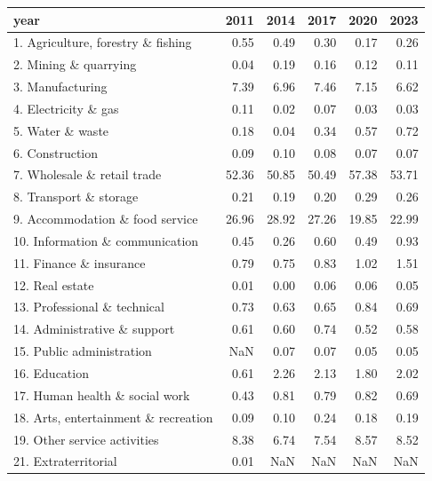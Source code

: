 \begin{tabular}{lrrrrr}
\toprule
year & 2011 & 2014 & 2017 & 2020 & 2023 \\
\midrule
1. Agriculture, forestry \& fishing & 0.55 & 0.49 & 0.30 & 0.17 & 0.26 \\
2. Mining \& quarrying & 0.04 & 0.19 & 0.16 & 0.12 & 0.11 \\
3. Manufacturing & 7.39 & 6.96 & 7.46 & 7.15 & 6.62 \\
4. Electricity \& gas & 0.11 & 0.02 & 0.07 & 0.03 & 0.03 \\
5. Water \& waste & 0.18 & 0.04 & 0.34 & 0.57 & 0.72 \\
6. Construction & 0.09 & 0.10 & 0.08 & 0.07 & 0.07 \\
7. Wholesale \& retail trade & 52.36 & 50.85 & 50.49 & 57.38 & 53.71 \\
8. Transport \& storage & 0.21 & 0.19 & 0.20 & 0.29 & 0.26 \\
9. Accommodation \& food service & 26.96 & 28.92 & 27.26 & 19.85 & 22.99 \\
10. Information \& communication & 0.45 & 0.26 & 0.60 & 0.49 & 0.93 \\
11. Finance \& insurance & 0.79 & 0.75 & 0.83 & 1.02 & 1.51 \\
12. Real estate & 0.01 & 0.00 & 0.06 & 0.06 & 0.05 \\
13. Professional \& technical & 0.73 & 0.63 & 0.65 & 0.84 & 0.69 \\
14. Administrative \& support & 0.61 & 0.60 & 0.74 & 0.52 & 0.58 \\
15. Public administration & NaN & 0.07 & 0.07 & 0.05 & 0.05 \\
16. Education & 0.61 & 2.26 & 2.13 & 1.80 & 2.02 \\
17. Human health \& social work & 0.43 & 0.81 & 0.79 & 0.82 & 0.69 \\
18. Arts, entertainment \& recreation & 0.09 & 0.10 & 0.24 & 0.18 & 0.19 \\
19. Other service activities & 8.38 & 6.74 & 7.54 & 8.57 & 8.52 \\
21. Extraterritorial & 0.01 & NaN & NaN & NaN & NaN \\
\bottomrule
\end{tabular}
